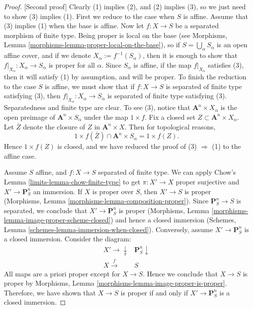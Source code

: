 \begin{proof}
[Second proof]
Clearly (1) implies (2), and (2) implies (3), so we just need to show (3)
implies (1).
First we reduce to the case when $S$ is affine.  Assume that (3) implies (1)
when the base is affine.  Now let $f: X \to S$ be a separated morphism of
finite type.  Being proper is local on the base
(see Morphisms, Lemma \ref{morphisms-lemma-proper-local-on-the-base}), so if
$S = \bigcup_\alpha S_\alpha$ is an open affine cover, and if
we denote $X_\alpha := f^{-1}(S_\alpha)$, then it is
enough to show that $f|_{X_\alpha}: X_\alpha \to S_\alpha$ is proper
for all $\alpha$.  Since $S_\alpha$ is affine, if
the map $f|_{X_\alpha}$ satisfies (3), then it will satisfy (1)
by assumption, and will be proper.  To finish the reduction to the
case $S$ is affine, we must show that if $f: X \to S$ is separated of
finite type satisfying (3), then $f|_{X_\alpha} : X_\alpha \to S_\alpha$
is separated of finite type satisfying (3).  Separatedness and finite
type are clear.  To see (3), notice that
$\mathbf{A}^n \times X_\alpha$ is the open preimage of
$\mathbf{A}^n \times S_\alpha$ under the map $1 \times f$.  Fix a closed
set $Z \subset \mathbf A^n \times X_\alpha$.  Let $\bar Z$ denote the
closure of $Z$ in $\mathbf{A}^n \times X$.  Then for topological
reasons,
$$
1 \times f(\bar Z) \cap \mathbf{A}^n \times S_\alpha  = 1 \times f(Z).
$$
Hence $1 \times f(Z)$ is closed, and we have reduced the proof of
(3) $\Rightarrow$ (1) to the affine case.

\medskip\noindent
Assume $S$ affine, and $f : X \to S$ separated of finite type.
We can apply Chow's Lemma \ref{limits-lemma-chow-finite-type}
to get $\pi : X' \to X$ proper surjective and $X' \to \mathbf{P}^n_S$
an immersion. If $X$ is proper over $S$, then $X' \to S$ is proper
(Morphisms, Lemma \ref{morphisms-lemma-composition-proper}). Since
$\mathbf{P}^n_S \to S$ is separated, we conclude that $X' \to
\mathbf{P}^n_S$ is proper
(Morphisms, Lemma \ref{morphisms-lemma-image-proper-scheme-closed})
and hence a closed immersion
(Schemes, Lemma \ref{schemes-lemma-immersion-when-closed}).
Conversely, assume $X' \to \mathbf{P}^n_S$ is a closed immersion.
Consider the diagram:
\begin{equation}
\label{equation-check-proper}
\begin{array}{cc}X' \longrightarrow\underset{\pi}{\downarrow} & \mathbf{P}^n_S \downarrow \\ X \overset{f}{\longrightarrow} & S\end{array}
\end{equation}
All maps are a priori proper except for $X \to S$.
Hence we conclude that $X \to S$ is proper by
Morphisms, Lemma \ref{morphisms-lemma-image-proper-is-proper}.
Therefore, we have shown that $X \to S$ is proper if and only if
$X' \to \mathbf{P}^n_S$ is a closed immersion.


\end{proof}
